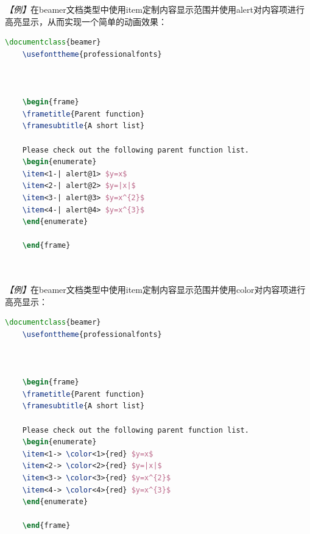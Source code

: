 \emph{【例】}在beamer文档类型中使用item定制内容显示范围并使用alert对内容项进行高亮显示，从而实现一个简单的动画效果：
\begin{lstlisting}[language=TeX]
    \documentclass{beamer}
    \usefonttheme{professionalfonts}

    

    \begin{frame}
    \frametitle{Parent function}
    \framesubtitle{A short list}

    Please check out the following parent function list.
    \begin{enumerate}
    \item<1-| alert@1> $y=x$
    \item<2-| alert@2> $y=|x|$
    \item<3-| alert@3> $y=x^{2}$
    \item<4-| alert@4> $y=x^{3}$
    \end{enumerate}

    \end{frame}

    
\end{lstlisting}

\emph{【例】}在beamer文档类型中使用item定制内容显示范围并使用color对内容项进行高亮显示：
\begin{lstlisting}[language=TeX]
    \documentclass{beamer}
    \usefonttheme{professionalfonts}

    

    \begin{frame}
    \frametitle{Parent function}
    \framesubtitle{A short list}

    Please check out the following parent function list.
    \begin{enumerate}
    \item<1-> \color<1>{red} $y=x$
    \item<2-> \color<2>{red} $y=|x|$
    \item<3-> \color<3>{red} $y=x^{2}$
    \item<4-> \color<4>{red} $y=x^{3}$
    \end{enumerate}

    \end{frame}

    
\end{lstlisting}

